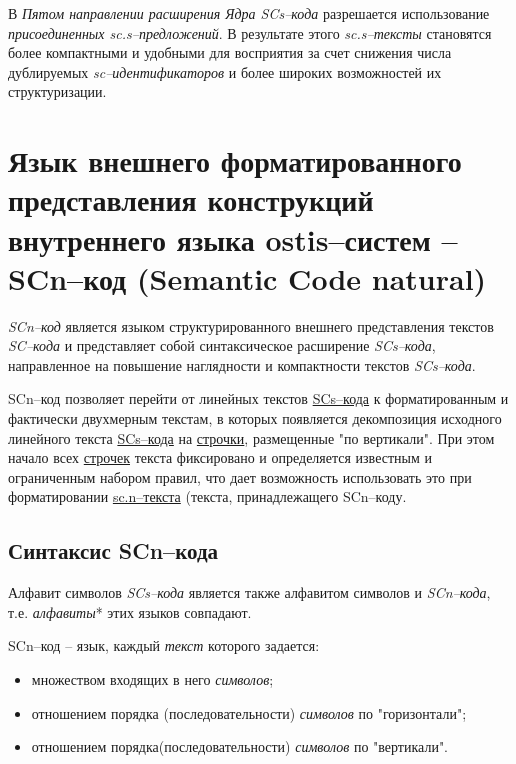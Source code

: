 В \textit{Пятом направлении расширения Ядра SCs--кода} разрешается использование \textit{присоединенных \mbox{sc.s--предложений}}. В результате этого \textit{sc.s--тексты} становятся более компактными и удобными для восприятия за счет снижения числа дублируемых \textit{sc--идентификаторов} и более широких возможностей их структуризации.



\section{Язык внешнего форматированного представления конструкций внутреннего языка ostis--систем -- SCn--код (Semantic Code natural)}
\label{sec_scn}


\begin{SCn}
\end{SCn}

\textit{SCn--код} является языком структурированного внешнего представления текстов \textit{SC--кода} и представляет собой синтаксическое расширение \textit{SCs--кода}, направленное на повышение наглядности и компактности текстов \textit{SCs--кода}. 

SCn--код позволяет перейти от линейных текстов \uline{SCs--кода} к форматированным и фактически двухмерным текстам, в которых появляется декомпозиция исходного линейного текста \uline{SCs--кода} на \uline{строчки}, размещенные "по вертикали"{}. При этом начало всех \uline{строчек} текста фиксировано и определяется известным и ограниченным набором правил, что дает возможность использовать это при форматировании \uline{sc.n--текста} (текста, принадлежащего SCn--коду.


\subsection{Синтаксис SCn--кода}

Алфавит символов \textit{SCs--кода} является также алфавитом символов и \textit{SCn--кода}, т.е. \textit{алфавиты}* этих языков совпадают.

SCn--код -- язык, каждый \textit{текст} которого задается:
\begin{itemize}
	\item множеством входящих в него \textit{символов};
	\item отношением порядка (последовательности) \textit{символов} по "горизонтали"{};
	\item отношением порядка(последовательности) \textit{символов} по "вертикали"{}.
\end{itemize}

